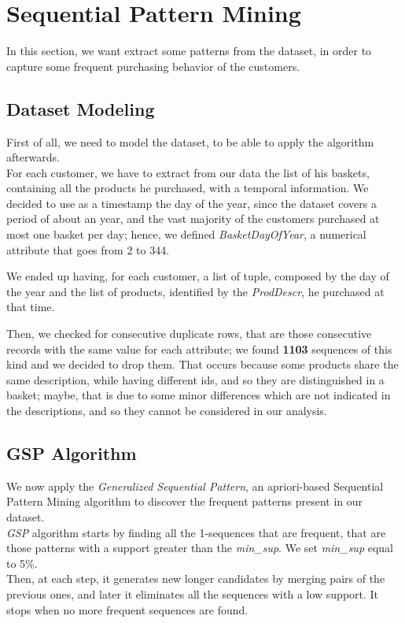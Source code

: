 \section{Sequential Pattern Mining}
In this section, we want extract some patterns from the dataset, in order to capture some frequent purchasing behavior of the customers. 

\subsection{Dataset Modeling}
First of all, we need to model the dataset, to be able to apply the algorithm afterwards.\\
For each customer, we have to extract from our data the list of his baskets, containing all the products he purchased, with a temporal information. 
We decided to use as a timestamp the day of the year, since the dataset covers a period of about an year, and the vast majority of the customers purchased at most one basket per day; hence, we defined \emph{BasketDayOfYear}, a numerical attribute that goes from 2 to 344.

We ended up having, for each customer, a list of tuple, composed by the day of the year and the list of products, identified by the \emph{ProdDescr}, he purchased at that time.

Then, we checked for consecutive duplicate rows, that are those consecutive records with the same value for each attribute; we found \textbf{1103} sequences of this kind and we decided to drop them.
That occurs because some products share the same description, while having different ids, and so they are distinguished in a basket; maybe, that is due to some minor differences which are not indicated in the descriptions, and so they cannot be considered in our analysis.

\subsection{GSP Algorithm}
We now apply the \emph{Generalized Sequential Pattern}, an apriori-based Sequential Pattern Mining algorithm to discover the frequent patterns present in our dataset.\\
\emph{GSP} algorithm starts by finding all the 1-sequences that are frequent, that are those patterns with a support greater than the \emph{min\_sup}. We set \emph{min\_sup} equal to 5\%.\\
Then, at each step, it generates new longer candidates by merging pairs of the previous ones, and later it eliminates all the sequences with a low support. It stops when no more frequent sequences are found.

